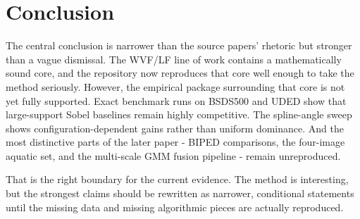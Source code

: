 \documentclass[conference]{IEEEtran}
\begin{document}
\section{Conclusion}

The central conclusion is narrower than the source papers' rhetoric but stronger than a vague dismissal. The WVF/LF line of work contains a mathematically sound core, and the repository now reproduces that core well enough to take the method seriously. However, the empirical package surrounding that core is not yet fully supported. Exact benchmark runs on BSDS500 and UDED show that large-support Sobel baselines remain highly competitive. The spline-angle sweep shows configuration-dependent gains rather than uniform dominance. And the most distinctive parts of the later paper - BIPED comparisons, the four-image aquatic set, and the multi-scale GMM fusion pipeline - remain unreproduced.

That is the right boundary for the current evidence. The method is interesting, but the strongest claims should be rewritten as narrower, conditional statements until the missing data and missing algorithmic pieces are actually reproduced.
\end{document}
